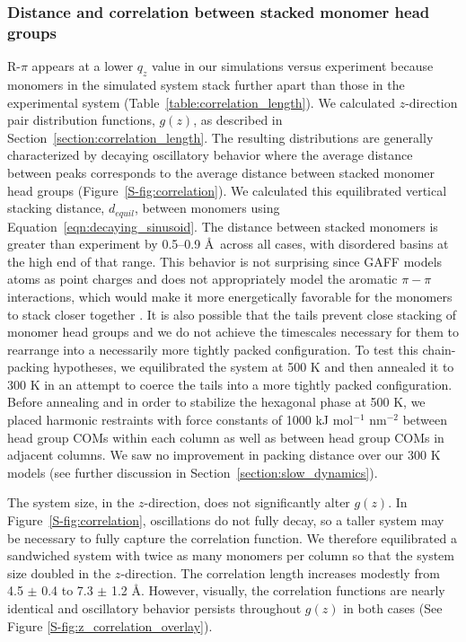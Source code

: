 \documentclass[journal=jpcbfk,manuscript=article]{achemso}
\begin{document}
  \subsubsection*{Distance and correlation between stacked monomer head groups}

  R-$\pi$ appears at a lower $q_z$ value in our simulations versus experiment
  because monomers in the simulated system stack further apart than those in the
  experimental system (Table~\ref{table:correlation_length}). We calculated
  $z$-direction pair distribution functions, $g(z)$, as described in
  Section~\ref{section:correlation_length}. The resulting distributions are
  generally characterized by decaying oscillatory behavior where the average
  distance between peaks corresponds to the average distance between stacked
  monomer head groups (Figure~\ref{S-fig:correlation}). We calculated this
  equilibrated vertical stacking distance, $\mathit{d}_{equil}$, between monomers
  using Equation~\ref{eqn:decaying_sinusoid}. The distance between stacked
  monomers is greater than experiment by 0.5--0.9 \AA~across all cases, with
  disordered basins at the high end of that range. This behavior is not
  surprising since GAFF models atoms as point charges and does not appropriately
  model the aromatic $\pi-\pi$ interactions, which would make it more
  energetically favorable for the monomers to stack closer together
  \cite{wang_development_2004}. It is also possible that the tails prevent
  close stacking of monomer head groups and we do not achieve the timescales
  necessary for them to rearrange into a necessarily more tightly packed
  configuration. To test this chain-packing hypotheses, we equilibrated the
  system at 500 K and then annealed it to 300 K in an attempt to coerce the tails
  into a more tightly packed configuration. Before annealing and in order to
  stabilize the hexagonal phase at 500 K, we placed harmonic restraints with
  force constants of 1000 kJ mol$^{-1}$ nm$^{-2}$ between head group COMs within
  each column as well as between head group COMs in adjacent columns. We saw no
  improvement in packing distance over our 300 K models (see further discussion
  in Section~\ref{section:slow_dynamics}). 
  
  The system size, in the $z$-direction, does not significantly alter $g(z)$.
  In Figure~\ref{S-fig:correlation}, oscillations do not fully decay, so a taller
  system may be necessary to fully capture the correlation function. We therefore
  equilibrated a sandwiched system with twice as many monomers per column so that
  the system size doubled in the $z$-direction. The correlation length increases
  modestly from 4.5 $\pm$ 0.4 to 7.3 $\pm$ 1.2 \AA. However, visually, the
  correlation functions are nearly identical and oscillatory behavior persists
  throughout $g(z)$ in both cases (See
  Figure \ref{S-fig:z_correlation_overlay}).
\end{document}
